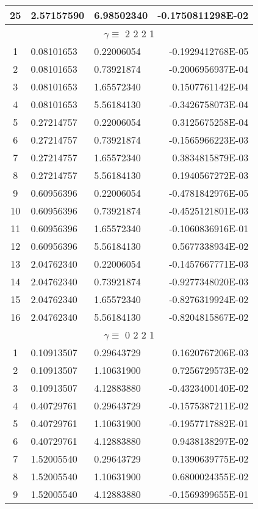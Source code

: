 \begin{longtable}{@{\extracolsep{\fill}}cllr@{}}
25  &  2.57157590  &  6.98502340  &  -0.1750811298E-02 \\
\midrule
\multicolumn{4}{c}{ $\gamma \equiv $  2 2 2 1} \\
\midrule
1  &  0.08101653  &  0.22006054  &  -0.1929412768E-05 \\
2  &  0.08101653  &  0.73921874  &  -0.2006956937E-04 \\
3  &  0.08101653  &  1.65572340  &   0.1507761142E-04 \\
4  &  0.08101653  &  5.56184130  &  -0.3426758073E-04 \\
5  &  0.27214757  &  0.22006054  &   0.3125675258E-04 \\
6  &  0.27214757  &  0.73921874  &  -0.1565966223E-03 \\
7  &  0.27214757  &  1.65572340  &   0.3834815879E-03 \\
8  &  0.27214757  &  5.56184130  &   0.1940567272E-03 \\
9  &  0.60956396  &  0.22006054  &  -0.4781842976E-05 \\
10  &  0.60956396  &  0.73921874  &  -0.4525121801E-03 \\
11  &  0.60956396  &  1.65572340  &  -0.1060836916E-01 \\
12  &  0.60956396  &  5.56184130  &   0.5677338934E-02 \\
13  &  2.04762340  &  0.22006054  &  -0.1457667771E-03 \\
14  &  2.04762340  &  0.73921874  &  -0.9277348020E-03 \\
15  &  2.04762340  &  1.65572340  &  -0.8276319924E-02 \\
16  &  2.04762340  &  5.56184130  &  -0.8204815867E-02 \\
\midrule
\multicolumn{4}{c}{ $\gamma \equiv $  0 2 2 1} \\
\midrule
1  &  0.10913507  &  0.29643729  &   0.1620767206E-03 \\
2  &  0.10913507  &  1.10631900  &   0.7256729573E-02 \\
3  &  0.10913507  &  4.12883880  &  -0.4323400140E-02 \\
4  &  0.40729761  &  0.29643729  &  -0.1575387211E-02 \\
5  &  0.40729761  &  1.10631900  &  -0.1957717882E-01 \\
6  &  0.40729761  &  4.12883880  &   0.9438138297E-02 \\
7  &  1.52005540  &  0.29643729  &   0.1390639775E-02 \\
8  &  1.52005540  &  1.10631900  &   0.6800024355E-02 \\
9  &  1.52005540  &  4.12883880  &  -0.1569399655E-01 \\
\end{longtable}

